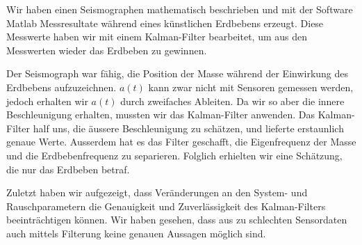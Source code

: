 Wir haben einen Seismographen mathematisch beschrieben und
mit der Software Matlab Messresultate während eines künstlichen Erdbebens erzeugt.
Diese Messwerte haben wir mit einem Kalman-Filter bearbeitet,
um aus den Messwerten wieder das Erdbeben zu gewinnen.

Der Seismograph war fähig, die Position der Masse während der Einwirkung des Erdbebens aufzuzeichnen.
$a(t)$ kann zwar nicht mit Sensoren gemessen werden, jedoch erhalten wir $a(t)$ durch zweifaches Ableiten.
Da wir so aber die innere Beschleunigung erhalten, mussten wir das Kalman-Filter anwenden.
Das Kalman-Filter half uns, die äussere Beschleunigung zu schätzen, und lieferte erstaunlich genaue Werte.
Ausserdem hat es das Filter geschafft, die Eigenfrequenz der Masse und die Erdbebenfrequenz zu separieren.
Folglich erhielten wir eine Schätzung, die nur das Erdbeben betraf.

Zuletzt haben wir aufgezeigt,
dass Veränderungen an den System- und Rauschparametern die Genauigkeit und Zuverlässigkeit
des Kalman-Filters beeinträchtigen können.
Wir haben gesehen, dass aus zu schlechten Sensordaten auch mittels Filterung keine genauen Aussagen möglich sind.

